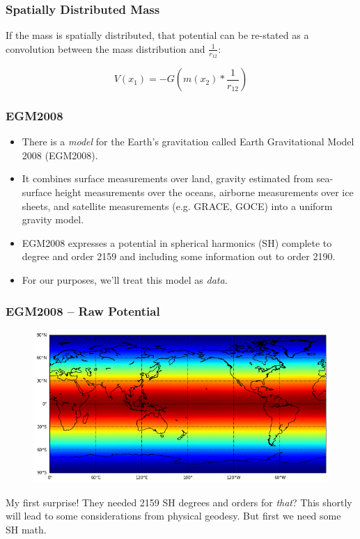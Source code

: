 \documentclass[aspectratio=43,mathserif]{beamer}
\begin{document}
\begin{frame}
\frametitle{Spatially Distributed Mass}

If the mass is spatially distributed, that potential can be re-stated as a convolution between the mass distribution and $\frac{1}{r_{12}}$: 

\[V(x_1) = -G \left(m(x_2) * \frac{1}{r_{12}}\right)\]

\end{frame}

\begin{frame}
\frametitle{EGM2008}

\begin{itemize}

\item There is a \emph{model} for the Earth's gravitation called Earth Gravitational Model 2008 (EGM2008). 

\item It combines surface measurements over land, gravity estimated from sea-surface height measurements over the oceans, airborne measurements over ice sheets, and satellite measurements (e.g. GRACE, GOCE) into a uniform gravity model.

\item EGM2008 expresses a potential in spherical harmonics (SH) complete to degree and order 2159 and including some information out to order 2190.

\item For our purposes, we'll treat this model as \emph{data}.  
\end{itemize}

\end{frame}

\begin{frame}
\frametitle{EGM2008 -- Raw Potential}

\begin{figure}
\includegraphics[width=0.9\linewidth]{EGM08Raw.png}
\end{figure}

My first surprise! They needed 2159 SH degrees and orders for \emph{that}? This shortly will lead to some considerations from physical geodesy. But first we need some SH math.

\end{frame}
\end{document}
